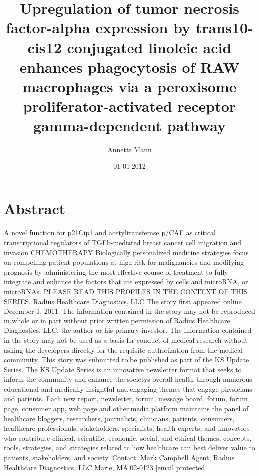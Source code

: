 \documentclass{article}%
\title{Upregulation of tumor necrosis factor{-}alpha expression by trans10{-}cis12 conjugated linoleic acid enhances phagocytosis of RAW macrophages via a peroxisome proliferator{-}activated receptor gamma{-}dependent pathway}%
\author{Annette Mann}%
\affil{Anesthesia Department, the Second Affiliated Hospital, School of Medicine, Xi'an Jiaotong University, Xi'an, P. R. China}%
\date{01{-}01{-}2012}%
\begin{document}
%
\normalsize%
\maketitle%
\section{Abstract}%
\label{sec:Abstract}%
A novel function for p21Cip1 and acetyltransferase p/CAF as critical transcriptional regulators of TGFb{-}mediated breast cancer cell migration and invasion\newline%
CHEMOTHERAPY\newline%
Biologically personalized medicine strategies focus on compelling patient populations at high risk for malignancies and modifying prognosis by administering the most effective course of treatment to fully integrate and enhance the factors that are expressed by cells and microRNA, or microRNAs.\newline%
PLEASE READ THIS PROFILES IN THE CONTEXT OF THIS SERIES. Radius Healthcare Diagnostics, LLC\newline%
The story first appeared online December 1, 2011. The information contained in the story may not be reproduced in whole or in part without prior written permission of Radius Healthcare Diagnostics, LLC, the author or his primary investor. The information contained in the story may not be used as a basis for conduct of medical research without asking the developers directly for the requisite authorization from the medical community.\newline%
This story was submitted to be published as part of the KS Update Series. The KS Update Series is an innovative newsletter format that seeks to inform the community and enhance the societys overall health through numerous educational and medically insightful and engaging themes that engage physicians and patients. Each new report, newsletter, forum, message board, forum, forum page, consumer app, web page and other media platform maintains the panel of healthcare bloggers, researchers, journalists, clinicians, patients, consumers, healthcare professionals, stakeholders, specialists, health experts, and innovators who contribute clinical, scientific, economic, social, and ethical themes, concepts, tools, strategies, and strategies related to how healthcare can best deliver value to patients, stakeholders, and society.\newline%
Contact: Mark Campbell\newline%
Agent, Radius Healthcare Diagnostics, LLC\newline%
Marie, MA 02{-}0123\newline%
{[}email protected{]}
\end{document}
